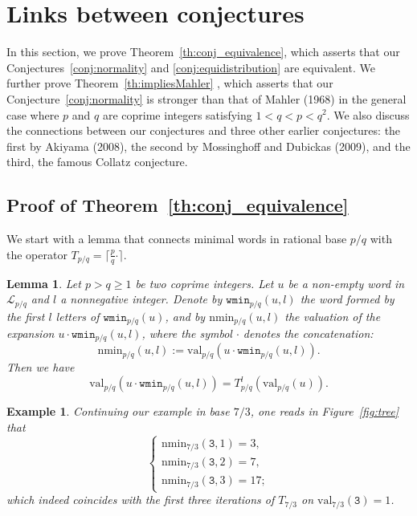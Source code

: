 \documentclass{template_arxiv}
\newtheorem{example}[theorem]{Example}
\newtheorem{lemma}[theorem]{Lemma}
\numberwithin{equation}{section}
\newcommand{\lan}{\mathcal{L}}
\newcommand{\wmin}{\mathtt{wmin}}
\newcommand{\nmin}{\mathrm{nmin}}
\newcommand{\val}{\mathrm{val}}
\begin{document}





\section{Links between conjectures}\label{sect:links_between_conjectures}

In this section, we prove Theorem~\ref{th:conj_equivalence}, which asserts that our Conjectures~\ref{conj:normality} and \ref{conj:equidistribution} are equivalent. We further prove Theorem~\ref{th:impliesMahler} , which asserts that our Conjecture~\ref{conj:normality} is stronger than that of Mahler (1968) in the general case where $p$ and $q$ are coprime integers satisfying $1<q<p<q^2$. We also discuss the connections between our conjectures and three other earlier conjectures: the first by Akiyama (2008), the second by Mossinghoff and Dubickas (2009), and the third, the famous Collatz conjecture. 

\subsection{Proof of Theorem~\ref{th:conj_equivalence}}


We start with a lemma that connects minimal words in rational base $p/q$ with the operator $T_{p/q}=\lceil \frac{p}{q} \bm{\cdot}\rceil$.


\begin{lemma}\label{lemma:link_wmin_operatorT}
	Let $p>q\geq1$ be two coprime integers. Let $u$ be a non-empty word in $\lan_{p/q}$ and $l$ a nonnegative integer. Denote by $\wmin_{p/q}(u,l)$ the word formed by the first $l$ letters of $\wmin_{p/q}(u)$, and by $\nmin_{p/q}(u,l)$ the valuation of the expansion $u\cdot\wmin_{p/q}(u,l)$, where the symbol $\cdot$ denotes the concatenation:
\[\nmin_{p/q}(u,l) := \val_{p/q}(u\cdot\wmin_{p/q}(u,l)).\]
	Then we have
		\[ \val_{p/q}(u\cdot\wmin_{p/q}(u,l)) = T^l_{p/q}(\val_{p/q}(u)).\]
\end{lemma}



\begin{example}
	Continuing our example in base $7/3$, one reads in Figure~\ref{fig:tree} that 
	\[ \begin{cases}
	\nmin_{7/3}(\mathtt{3},1) = 3,\\
	\nmin_{7/3}(\mathtt{3},2) = 7,\\
	\nmin_{7/3}(\mathtt{3},3) = 17 ;
	\end{cases}\]
	which indeed coincides with the first three iterations of $T_{7/3}$ on $\val_{7/3}(\mathtt{3}) =1$.    
\end{example}
\end{document}
